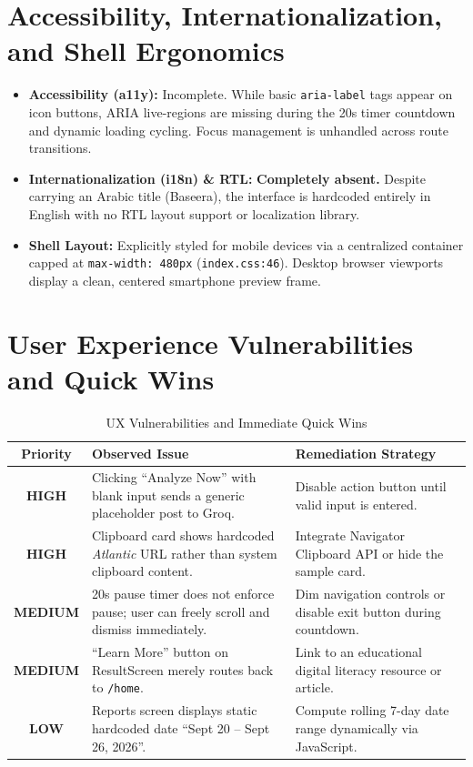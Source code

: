 \documentclass[10pt,a4paper]{report}
\newcommand{\badgeHigh}{\colorbox{orange!20}{\textcolor{critRed!80!orange}{\bfseries\scriptsize HIGH}}}
\newcommand{\badgeMed}{\colorbox{yellow!30}{\textcolor{warnOrange!80!black}{\bfseries\scriptsize MEDIUM}}}
\newcommand{\badgeLow}{\colorbox{green!15}{\textcolor{passGreen}{\bfseries\scriptsize LOW}}}
\begin{document}
\section{Accessibility, Internationalization, and Shell Ergonomics}
\begin{itemize}[leftmargin=1.5em]
    \item \textbf{Accessibility (a11y):} Incomplete. While basic \texttt{aria-label} tags appear on icon buttons, ARIA live-regions are missing during the 20s timer countdown and dynamic loading cycling. Focus management is unhandled across route transitions.
    \item \textbf{Internationalization (i18n) \& RTL:} \textbf{Completely absent.} Despite carrying an Arabic title (Baseera), the interface is hardcoded entirely in English with no RTL layout support or localization library.
    \item \textbf{Shell Layout:} Explicitly styled for mobile devices via a centralized container capped at \texttt{max-width: 480px} (\texttt{index.css:46}). Desktop browser viewports display a clean, centered smartphone preview frame.
\end{itemize}

\section{User Experience Vulnerabilities and Quick Wins}

\begin{table}[htbp]
\centering
\small
\caption{UX Vulnerabilities and Immediate Quick Wins}
\begin{tabularx}{\textwidth}{c p{5.5cm} X}
\toprule
\textbf{Priority} & \textbf{Observed Issue} & \textbf{Remediation Strategy} \\
\midrule
\badgeHigh & Clicking ``Analyze Now'' with blank input sends a generic placeholder post to Groq. & Disable action button until valid input is entered. \\
\addlinespace
\badgeHigh & Clipboard card shows hardcoded \textit{Atlantic} URL rather than system clipboard content. & Integrate Navigator Clipboard API or hide the sample card. \\
\addlinespace
\badgeMed & 20s pause timer does not enforce pause; user can freely scroll and dismiss immediately. & Dim navigation controls or disable exit button during countdown. \\
\addlinespace
\badgeMed & ``Learn More'' button on ResultScreen merely routes back to \texttt{/home}. & Link to an educational digital literacy resource or article. \\
\addlinespace
\badgeLow & Reports screen displays static hardcoded date ``Sept 20 -- Sept 26, 2026''. & Compute rolling 7-day date range dynamically via JavaScript. \\
\bottomrule
\end{tabularx}
\end{table}
\end{document}
